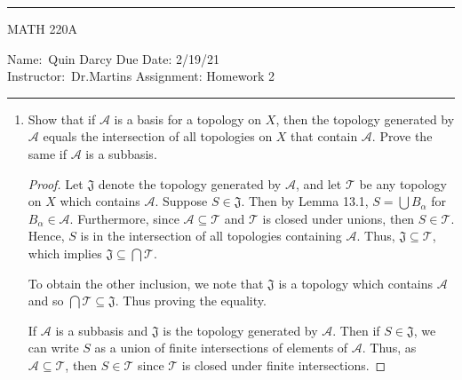 \documentclass[12pt]{article}
\theoremstyle{definition}
\begin{document}
    \thispagestyle{empty}\hrule

    \begin{center}
        \vspace{.4cm} { \large MATH 220A}
    \end{center}
    {Name:\ Quin Darcy \hspace{\fill} Due Date: 2/19/21  \\
    { Instructor:}\ Dr.Martins \hspace{\fill} Assignment:
    Homework 2 \\ \hrule}

    \begin{enumerate}
        \item Show that if $\mathcal{A}$ is a basis for a topology on $X$, then
            the topology generated by $\mathcal{A}$ equals the intersection of
            all topologies on $X$ that contain $\mathcal{A}$. Prove the same if
            $\mathcal{A}$ is a subbasis.
                \begin{proof}
                    Let $\mathfrak{J}$ denote the topology generated by $\mathcal{A}$, 
                    and let $\mathcal{T}$ be any topology on $X$
                    which contains $\mathcal{A}$. Suppose $S\in\mathfrak{J}$. Then by Lemma 13.1, 
                    $S=\bigcup B_{\alpha}$ for $B_{\alpha}\in\mathcal{A}$. 
                    Furthermore, since $\mathcal{A}\subseteq\mathcal{T}$ and $\mathcal{T}$ 
                    is closed under unions, then $S\in\mathcal{T}$. Hence, $S$ is in the 
                    intersection of all topologies containing $\mathcal{A}$. 
                    Thus, $\mathfrak{J}\subseteq\mathcal{T}$, which implies $\mathfrak{J}\subseteq\bigcap\mathcal{T}$. 
                    \par\hspace{4mm} To obtain the other inclusion, we note that $\mathfrak{J}$ is a topology 
                    which contains $\mathcal{A}$ and so $\bigcap\mathcal{T}\subseteq\mathfrak{J}$. 
                    Thus proving the equality.\par\hspace{4mm} If $\mathcal{A}$ is a 
                    subbasis and $\mathfrak{J}$ is the topology generated by $\mathcal{A}$. 
                    Then if $S\in\mathfrak{J}$, we can write $S$ as a union of finite intersections 
                    of elements of $\mathcal{A}$. Thus, as $\mathcal{A}\subseteq\mathcal{T}$, 
                    then $S\in\mathcal{T}$ since $\mathcal{T}$ is closed under finite intersections. 

\end{proof}
\end{enumerate}
\end{document}
